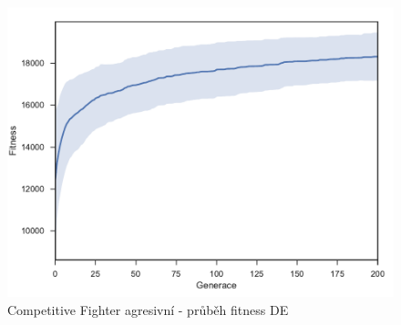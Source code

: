 \begin{figure}[h]\centering
	\includegraphics[width=0.75\columnwidth]{../img/CompetitiveMap/FighterKeep}
	\caption{Competitive Fighter agresivní - průběh fitness DE}
	\label{obr04:CompetitiveFighterAgresive}
\end{figure}
\clearpage
